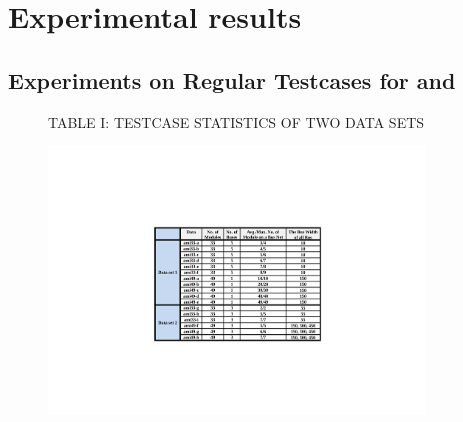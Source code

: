 \chapter{Experimental results}
\label{chap::EXPERIMENTAL RESULTS}

\baselineskip=26pt

\section{Experiments on Regular Testcases for \cite{Ma08} and \cite{PH10}}
\label{sec::EXPERIMENTS ON REGULAR TESTCASES}
\begin{figure}[htb]
{
  \centering
  \scriptsize
   TABLE I: TESTCASE STATISTICS OF TWO DATA SETS
   \centerline{\includegraphics[width=10cm]{Fig/table_1.pdf}}

  \label{fig::table1}
}
\end{figure}


